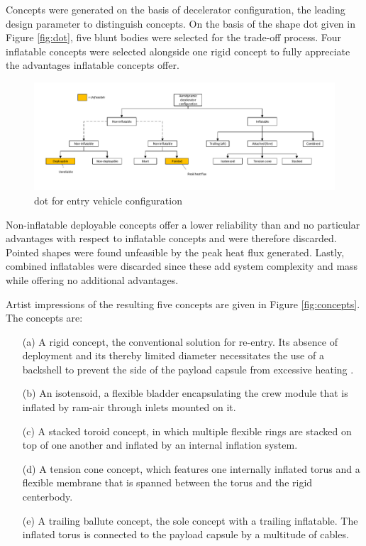 Concepts were generated on the basis of decelerator configuration, the leading design parameter to distinguish concepts. On the basis of the shape \acrfull{dot} given in Figure \ref{fig:dot}, five blunt bodies were selected for the trade-off process. Four inflatable concepts were selected alongside one rigid concept to fully appreciate the advantages inflatable concepts offer.

\begin{figure}[H]
\hspace{-23mm}
\includegraphics[width = 1.25\textwidth]{Figure/Concepts/DOT_configuration.pdf}
\vspace{-5mm}
\caption{\acrfull{dot} for entry vehicle configuration}
\label{fig:dotshape}
\end{figure}

Non-inflatable deployable concepts offer a lower reliability than and no particular advantages with respect to inflatable concepts and were therefore discarded. Pointed shapes were found unfeasible by the peak heat flux generated. Lastly, combined inflatables were discarded since these add system complexity and mass while offering no additional advantages. 

Artist impressions of the resulting five concepts are given in Figure \ref{fig:concepts}. The concepts are:
\begin{itemize}
\item[(a)] A rigid concept, the conventional solution for re-entry. Its absence of deployment and its thereby limited diameter necessitates the use of a backshell to prevent the side of the payload capsule from excessive heating \cite{Hughes2005}.
\item[(b)] An isotensoid, a flexible bladder encapsulating the crew module that is inflated by ram-air through inlets mounted on it.
\item[(c)] A stacked toroid concept, in which multiple flexible rings are stacked on top of one another and inflated by an internal inflation system.
\item[(d)] A tension cone concept, which features one internally inflated torus and a flexible membrane that is spanned between the torus and the rigid centerbody.
\item[(e)] A trailing ballute concept, the sole concept with a trailing inflatable. The inflated torus is connected to the payload capsule by a multitude of cables.
\end{itemize}





